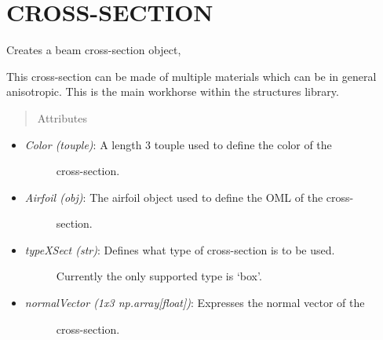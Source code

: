 \documentclass[letterpaper,10pt,english]{sphinxmanual}
\begin{document}
\section{CROSS-SECTION}
\label{structures:cross-section}

\begin{fulllineitems}
\label{structures:AeroComBAT.Structures.XSect}
Creates a beam cross-section object,

This cross-section can be made of multiple materials which can be in
general anisotropic. This is the main workhorse within the structures
library.
\begin{quote}\begin{description}
\item[{Attributes}] \leavevmode
\end{description}\end{quote}
\begin{itemize}
\item {} \begin{description}
\item[{\emph{Color (touple)}: A length 3 touple used to define the color of the}] \leavevmode
cross-section.

\end{description}

\item {} \begin{description}
\item[{\emph{Airfoil (obj)}: The airfoil object used to define the OML of the cross-}] \leavevmode
section.

\end{description}

\item {} \begin{description}
\item[{\emph{typeXSect (str)}: Defines what type of cross-section is to be used.}] \leavevmode
Currently the only supported type is `box'.

\end{description}

\item {} \begin{description}
\item[{\emph{normalVector (1x3 np.array{[}float{]})}: Expresses the normal vector of the}] \leavevmode
cross-section.


\end{description}
\end{itemize}
\end{fulllineitems}
\end{document}
